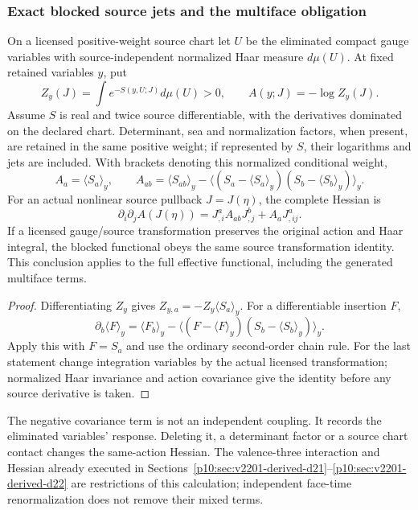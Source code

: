 \documentclass[12pt,a4paper]{article}
\begin{document}
\subsubsection{Exact blocked source jets and the multiface obligation}
\begin{theorem}
\label{p10:thm:v2210-lit-blocked-source-jets}
On a licensed positive-weight source chart let $U$ be the eliminated
compact gauge variables with source-independent normalized Haar measure
$d\mu(U)$. At fixed retained variables $y$, put
\[
 Z_y(J)=\int e^{-S(y,U;J)}d\mu(U)>0,
 \qquad A(y;J)=-\log Z_y(J).
\]
Assume $S$ is real and twice source differentiable, with the derivatives
dominated on the declared chart. Determinant, sea and normalization factors,
when present, are retained in the same positive weight; if represented by
$S$, their logarithms and jets are included. With brackets denoting this
normalized conditional weight,
\[
 \boxed{A_a=\langle S_a\rangle_y,\qquad
 A_{ab}=\langle S_{ab}\rangle_y
       -\langle(S_a-\langle S_a\rangle_y)
                (S_b-\langle S_b\rangle_y)\rangle_y.}
\]
For an actual nonlinear source pullback $J=J(\eta)$, the complete Hessian is
\[
 \boxed{\partial_i\partial_j A(J(\eta))
 =J^a_{,i}A_{ab}J^b_{,j}+A_aJ^a_{,ij}.}
\]
If a licensed gauge/source transformation preserves the original action and
Haar integral, the blocked functional obeys the same source transformation
identity. This conclusion applies to the full effective functional, including
the generated multiface terms.
\end{theorem}
\begin{proof}
Differentiating $Z_y$ gives $Z_{y,a}=-Z_y\langle S_a\rangle_y$.
For a differentiable insertion $F$,
\[
 \partial_b\langle F\rangle_y
 =\langle F_b\rangle_y-
   \langle(F-\langle F\rangle_y)(S_b-\langle S_b\rangle_y)\rangle_y.
\]
Apply this with $F=S_a$ and use the ordinary second-order chain rule.
For the last statement change integration variables by the actual licensed
transformation; normalized Haar invariance and action covariance give the
identity before any source derivative is taken.
\end{proof}
The negative covariance term is not an independent coupling. It records the
eliminated variables' response. Deleting it, a determinant factor or a source
chart contact changes the same-action Hessian. The valence-three interaction
and Hessian already executed in
Sections~\ref{p10:sec:v2201-derived-d21}--\ref{p10:sec:v2201-derived-d22}
are restrictions of this calculation; independent face-time renormalization
does not remove their mixed terms.
\end{document}

